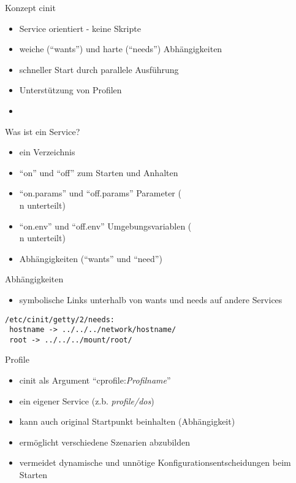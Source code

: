 \documentclass[pdf,autumn,slideColor,colorBG,total]{prosper}
\begin{document}
\begin{slide}{Konzept cinit}
\begin{itemize}
\item Service orientiert - keine Skripte
\item weiche ("`wants"') und harte ("`needs"') Abh\"angigkeiten
\item schneller Start durch parallele Ausf\"uhrung
\item Unterst\"utzung von Profilen
\item 
\end{itemize}
\end{slide}
\begin{slide}{Was ist ein Service?}
\begin{itemize}
\item ein Verzeichnis
\item "`on"' und "`off"' zum Starten und Anhalten
\item "`on.params"' und "`off.params"' Parameter (\\n unterteilt)
\item "`on.env"' und "`off.env"' Umgebungsvariablen  (\\n unterteilt)
\item Abh\"angigkeiten ("`wants"' und "`need"')
\end{itemize}
\end{slide}
\begin{slide}{Abh\"angigkeiten}
\begin{itemize}
\item symbolische Links unterhalb von wants und needs auf andere Services
\end{itemize}
\begin{verbatim}
/etc/cinit/getty/2/needs:
 hostname -> ../../../network/hostname/
 root -> ../../../mount/root/
\end{verbatim}
\end{slide}
\begin{slide}{Profile}
\begin{itemize}
\item cinit als Argument "`cprofile:\textit{Profilname}"'
\item ein eigener Service (z.b. \textit{profile/dos})
\item kann auch original Startpunkt beinhalten (Abh\"angigkeit)
\item erm\"oglicht verschiedene Szenarien abzubilden
\item vermeidet dynamische und unn\"otige Konfigurationsentscheidungen beim Starten
\end{itemize}
\end{slide}
\end{document}

